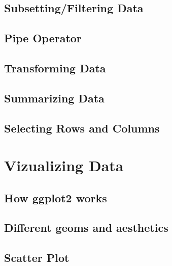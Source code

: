 \documentclass[
]{book}
\begin{document}
\hypertarget{subsettingfiltering-data}{%
\subsection{Subsetting/Filtering Data}\label{subsettingfiltering-data}}

\hypertarget{pipe-operator}{%
\subsection{Pipe Operator}\label{pipe-operator}}

\hypertarget{transforming-data}{%
\subsection{Transforming Data}\label{transforming-data}}

\hypertarget{summarizing-data}{%
\subsection{Summarizing Data}\label{summarizing-data}}

\hypertarget{selecting-rows-and-columns}{%
\subsection{Selecting Rows and Columns}\label{selecting-rows-and-columns}}

\hypertarget{vizualizing-data}{%
\section{Vizualizing Data}\label{vizualizing-data}}

\hypertarget{how-ggplot2-works}{%
\subsection{How ggplot2 works}\label{how-ggplot2-works}}

\hypertarget{different-geoms-and-aesthetics}{%
\subsection{Different geoms and aesthetics}\label{different-geoms-and-aesthetics}}

\hypertarget{scatter-plot}{%
\subsection{Scatter Plot}\label{scatter-plot}}
\end{document}
